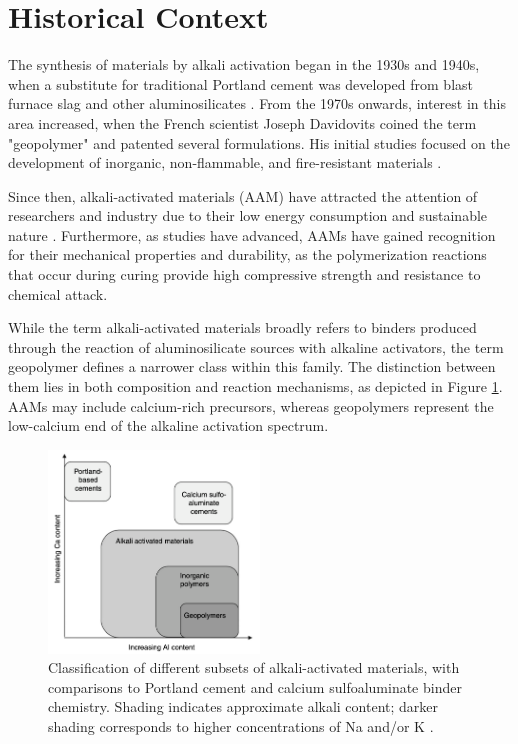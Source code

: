 \section{Historical Context}

The synthesis of materials by alkali activation began in the 1930s and 1940s, when a substitute for traditional Portland cement was developed from blast furnace slag and other aluminosilicates \cite{pachecotorgal2014handbook}.
From the 1970s onwards, interest in this area increased, when the French scientist Joseph Davidovits coined the term "geopolymer" and patented several formulations. His initial studies focused on the development of inorganic, non-flammable, and fire-resistant materials \cite{provis2009geopolymers}.


Since then, alkali-activated materials (AAM) have attracted the attention of researchers and industry due to their low energy consumption and sustainable nature \cite{qin2022onepart}.
Furthermore, as studies have advanced, AAMs have gained recognition for their mechanical properties and durability, as the polymerization reactions that occur during curing provide high compressive strength and resistance to chemical attack.


While the term alkali-activated materials broadly refers to binders produced through the reaction of aluminosilicate sources with alkaline activators, the term geopolymer defines a narrower class within this family.
The distinction between them lies in both composition and reaction mechanisms, as depicted in Figure \ref{fig:al_ca_aam}.
AAMs may include calcium-rich precursors, whereas geopolymers represent the low-calcium end of the alkaline activation spectrum.

\begin{figure}[H]
  \centering
  \includegraphics[width=0.5\textwidth]{Cap2/images/al_ca_aam.png}
  \caption{Classification of different subsets of alkali-activated materials, with comparisons to Portland cement and
calcium sulfoaluminate binder chemistry. Shading
indicates approximate alkali content; darker shading
corresponds to higher concentrations of Na and/or K \cite{rakhimova2019reaction}.}
  \label{fig:al_ca_aam}
\end{figure}


